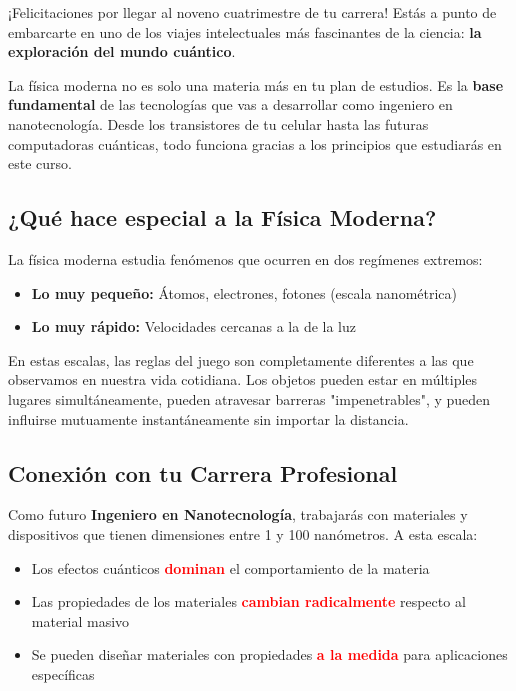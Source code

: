 \documentclass[12pt,a4paper]{book}
\newcommand{\importante}[1]{\textcolor{red}{\textbf{#1}}}
\begin{document}
	¡Felicitaciones por llegar al noveno cuatrimestre de tu carrera! Estás a punto de embarcarte en uno de los viajes intelectuales más fascinantes de la ciencia: \textbf{la exploración del mundo cuántico}.
	
	\begin{consejobox}
		La física moderna no es solo una materia más en tu plan de estudios. Es la \textbf{base fundamental} de las tecnologías que vas a desarrollar como ingeniero en nanotecnología. Desde los transistores de tu celular hasta las futuras computadoras cuánticas, todo funciona gracias a los principios que estudiarás en este curso.
	\end{consejobox}
	
	\subsection{¿Qué hace especial a la Física Moderna?}
	
	La física moderna estudia fenómenos que ocurren en dos regímenes extremos:
	
	\begin{itemize}
		\item \textbf{Lo muy pequeño:} Átomos, electrones, fotones (escala nanométrica)
		\item \textbf{Lo muy rápido:} Velocidades cercanas a la de la luz
	\end{itemize}
	
	En estas escalas, las reglas del juego son completamente diferentes a las que observamos en nuestra vida cotidiana. Los objetos pueden estar en múltiples lugares simultáneamente, pueden atravesar barreras "impenetrables", y pueden influirse mutuamente instantáneamente sin importar la distancia.
	
	\subsection{Conexión con tu Carrera Profesional}
	
	Como futuro \textbf{Ingeniero en Nanotecnología}, trabajarás con materiales y dispositivos que tienen dimensiones entre 1 y 100 nanómetros. A esta escala:
	
	\begin{itemize}
		\item Los efectos cuánticos \importante{dominan} el comportamiento de la materia
		\item Las propiedades de los materiales \importante{cambian radicalmente} respecto al material masivo
		\item Se pueden diseñar materiales con propiedades \importante{a la medida} para aplicaciones específicas
	\end{itemize}
	
\end{document}
